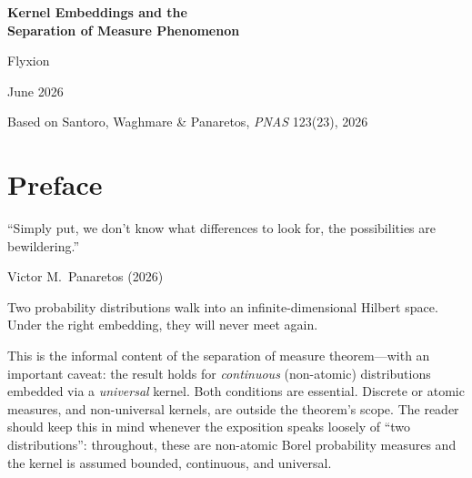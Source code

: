 \documentclass[12pt, oneside]{book}
\theoremstyle{plain}
\theoremstyle{definition}
\begin{document}

\begin{titlepage}
\thispagestyle{empty}
\begin{center}
\vspace*{4cm}

{\fontsize{26}{34}\selectfont\bfseries\color{deepblue}
Kernel Embeddings and the\\[8pt]
Separation of Measure Phenomenon}

\vspace{2.2cm}

{\Large\color{darkgray} Flyxion}

\vspace{0.6cm}

{\normalsize\color{medgray} June 2026}

\vfill

{\small\color{medgray} Based on Santoro, Waghmare \& Panaretos, \textit{PNAS} 123(23), 2026}

\end{center}
\end{titlepage}

\frontmatter
\tableofcontents

\chapter*{Preface}

\epigraph{``Simply put, we don't know what differences to look for, the possibilities
are bewildering.''}{Victor M.\ Panaretos (2026)}

\noindent
Two probability distributions walk into an infinite-dimensional Hilbert space. Under the right embedding, they will never meet again.

This is the informal content of the separation of measure theorem---with an important caveat: the result holds for \emph{continuous} (non-atomic) distributions embedded via a \emph{universal} kernel. Both conditions are essential. Discrete or atomic measures, and non-universal kernels, are outside the theorem's scope. The reader should keep this in mind whenever the exposition speaks loosely of ``two distributions'': throughout, these are non-atomic Borel probability measures and the kernel is assumed bounded, continuous, and universal.
\end{document}
